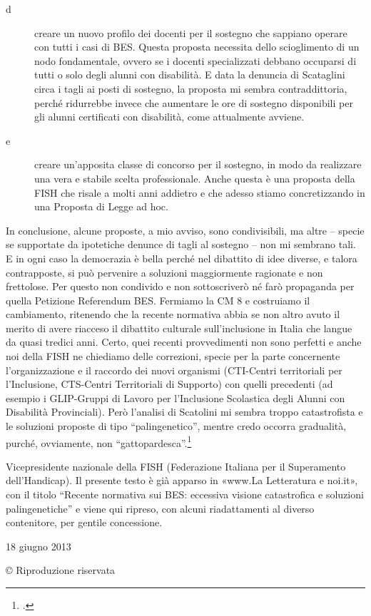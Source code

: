 \begin{description}
	\item [d]creare un nuovo profilo dei docenti per il sostegno che sappiano operare con tutti i casi di BES. Questa proposta necessita dello scioglimento di un nodo fondamentale, ovvero se i docenti specializzati debbano occuparsi di tutti o solo degli alunni con disabilità. E data la denuncia di Scataglini circa i tagli ai posti di sostegno, la proposta mi sembra contraddittoria, perché ridurrebbe invece che aumentare le ore di sostegno disponibili per gli alunni certificati con disabilità, come attualmente avviene.
	\item [e] creare un'apposita classe di concorso per il sostegno, in modo da realizzare una vera e stabile scelta professionale. Anche questa è una proposta della FISH che risale a molti anni addietro e che adesso stiamo concretizzando in una Proposta di Legge ad hoc.
\end{description}

In conclusione, alcune proposte, a mio avviso, sono condivisibili, ma altre – specie se supportate da ipotetiche denunce di tagli al sostegno – non mi sembrano tali. E in ogni caso la democrazia è bella perché nel dibattito di idee diverse, e talora contrapposte, si può pervenire a soluzioni maggiormente ragionate e non frettolose.
Per questo non condivido e non sottoscriverò né farò propaganda per quella Petizione Referendum BES. Fermiamo la CM 8 e costruiamo il cambiamento, ritenendo che la recente normativa abbia se non altro avuto il merito di avere riacceso il dibattito culturale sull'inclusione in Italia che langue da quasi tredici anni.
Certo, quei recenti provvedimenti non sono perfetti e anche noi della FISH ne chiediamo delle correzioni, specie per la parte concernente l'organizzazione e il raccordo dei nuovi organismi (CTI-Centri territoriali per l'Inclusione, CTS-Centri Territoriali di Supporto) con quelli precedenti (ad esempio i GLIP-Gruppi di Lavoro per l'Inclusione Scolastica degli Alunni con Disabilità Provinciali). Però l'analisi di Scatolini mi sembra troppo catastrofista e le soluzioni proposte di tipo “palingenetico”, mentre credo occorra gradualità, purché, ovviamente, non “gattopardesca”.\footcite{nocera6}

Vicepresidente nazionale della FISH (Federazione Italiana per il Superamento dell’Handicap). Il presente testo è già apparso in «www.La Letteratura e noi.it», con il titolo “Recente normativa sui BES: eccessiva visione catastrofica e soluzioni palingenetiche” e viene qui ripreso, con alcuni riadattamenti al diverso contenitore, per gentile concessione.

18 giugno 2013

© Riproduzione riservata